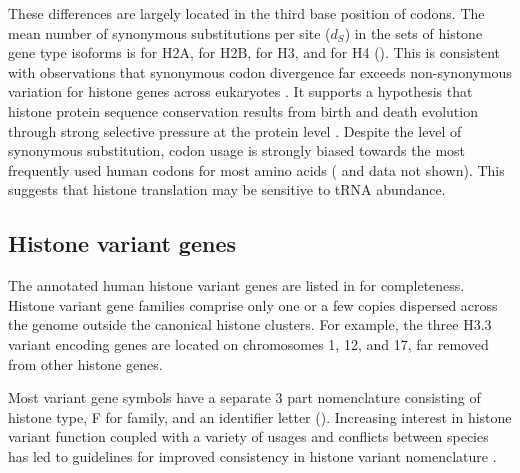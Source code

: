     These differences are largely located in the third base position of codons.
    The mean number of synonymous substitutions per site ($d_S$)
    in the sets of histone gene type isoforms is
     \result{} for H2A,
     \result{} for H2B,
     \result{} for H3,
    and  \result{} for H4 ().
    This is consistent with observations that
    synonymous codon divergence far exceeds non-synonymous variation
    for histone genes across eukaryotes \citep{Piontkivska2002, Rooney2002}.
    It supports a hypothesis that histone protein sequence conservation
    results from birth and death evolution through strong selective pressure
    at the protein level \citep{NeiRooney2005}.
    Despite the level of synonymous substitution,
    codon usage is strongly biased towards the most frequently used
    human codons for most amino acids
    ( and data not shown).
    This suggests that histone translation may be sensitive to tRNA abundance.

  \subsection{Histone variant genes}
    The \TotalCoreVariantGenes{} annotated human histone variant genes
    are listed in  for completeness.
    Histone variant gene families comprise only one or a few copies
    dispersed across the genome outside the canonical histone clusters.
    For example, the three H3.3 variant encoding genes are located
    on chromosomes 1, 12, and 17, far removed from other histone genes.

    Most variant gene symbols have a separate 3 part nomenclature
    consisting of histone type, F for family,
    and an identifier letter ().
    Increasing interest in histone variant function \citep{MazeAllis2014}
    coupled with a variety of usages and conflicts between species
    has led to guidelines for improved consistency in histone variant nomenclature
    \citep{Talbert2012}.
